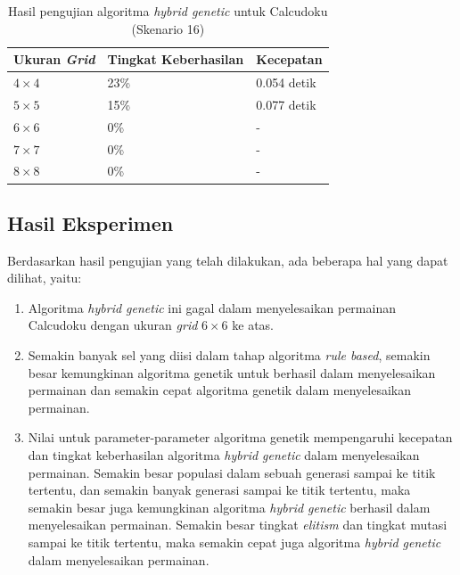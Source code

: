 \begin{table}
\centering
\captionsetup{justification=centering}
\caption[Hasil pengujian algoritma \textit{hybrid genetic} untuk Calcudoku (Skenario 16)]{Hasil pengujian algoritma \textit{hybrid genetic} untuk Calcudoku (Skenario 16)}
\begin{tabular}{| l | l | l |}
\hline
Ukuran \textit{Grid} & Tingkat Keberhasilan & Kecepatan \\
\hline \hline
\begin{math}4 \times 4\end{math} & 23\% & 0.054 detik \\
\hline
\begin{math}5 \times 5\end{math} & 15\% & 0.077 detik \\
\hline
\begin{math}6 \times 6\end{math} & 0\% & - \\
\hline
\begin{math}7 \times 7\end{math} & 0\% & - \\
\hline
\begin{math}8 \times 8\end{math} & 0\% & - \\
\hline
\end{tabular}
\label{tab:pengujianhg16}
\end{table}

\clearpage

\subsection{Hasil Eksperimen}
\label{sec:hasileksperimen}

Berdasarkan hasil pengujian yang telah dilakukan, ada beberapa hal yang dapat dilihat, yaitu:

\begin{enumerate}
\item Algoritma \textit{hybrid genetic} ini gagal dalam menyelesaikan permainan Calcudoku dengan ukuran \textit{grid} \begin{math}6 \times 6\end{math} ke atas.
\item Semakin banyak sel yang diisi dalam tahap algoritma \textit{rule based}, semakin besar kemungkinan algoritma genetik untuk berhasil dalam menyelesaikan permainan dan semakin cepat algoritma genetik dalam menyelesaikan permainan.
\item Nilai untuk parameter-parameter algoritma genetik mempengaruhi kecepatan dan tingkat keberhasilan algoritma \textit{hybrid genetic} dalam menyelesaikan permainan. Semakin besar populasi dalam sebuah generasi sampai ke titik tertentu, dan semakin banyak generasi sampai ke titik tertentu, maka semakin besar juga kemungkinan algoritma \textit{hybrid genetic} berhasil dalam menyelesaikan permainan. Semakin besar tingkat \textit{elitism} dan tingkat mutasi sampai ke titik tertentu, maka semakin cepat juga algoritma \textit{hybrid genetic} dalam menyelesaikan permainan.
\end{enumerate}